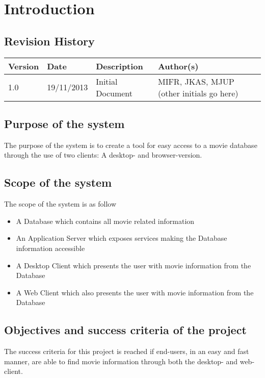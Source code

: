 \chapter{Introduction}
\label{sec:introduction}

\section{Revision History}
\begin{center}
    \begin{tabular}{ | l | l | p{6cm} | p{4cm} |}
    \hline
    Version & Date & Description & Author(s) \\ \hline
    1.0 & 19/11/2013 & Initial Document & MIFR, JKAS, MJUP (other initials go here)
    \\ \hline
    \end{tabular}
\end{center}

\section{Purpose of the system}

The purpose of the system is to create a tool for easy access to a movie database through the use of two clients: A desktop- and browser-version.


\section{Scope of the system}

The scope of the system is as follow

\begin{itemize}
\item A Database which contains all movie related information
\item An Application Server which exposes services making the Database information accessible
\item A Desktop Client which presents the user with movie information from the Database
\item A Web Client which also presents the user with movie information from the Database
\end{itemize} 

\section{Objectives and success criteria of the project}

The success criteria for this project is reached if end-users, in an easy and fast manner, are able to find movie information through both the desktop- and web-client.

